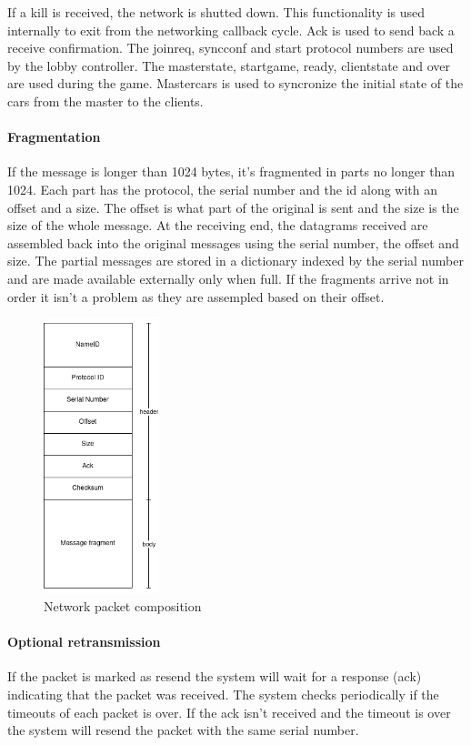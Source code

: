 \documentclass[12pt]{article}
\begin{document}
If a kill is received, the network is shutted down. This functionality is used internally to exit from the networking callback cycle. Ack is used to send back a receive confirmation. The joinreq, syncconf and start protocol numbers are used by the lobby controller. The masterstate, startgame, ready, clientstate and over are used during the game. Mastercars is used to syncronize the initial state of the cars from the master to the clients. \\

\clearpage

\paragraph{Fragmentation}
If the message is longer than 1024 bytes, it's fragmented in parts no longer than 1024. Each part has the protocol, the serial number and the id along with an offset and a size. The offset is what part of the original is sent and the size is the size of the whole message. At the receiving end, the datagrams received are assembled back into the original messages using the serial number, the offset and size. The partial messages are stored in a dictionary indexed by the serial number and are made available externally only when full. If the fragments arrive not in order it isn't a problem as they are assempled based on their offset.

\begin{figure}[H]
\begin{center}
\includegraphics[height=8cm]{packet}
\end{center}
\caption{Network packet composition}
\end{figure}

\paragraph{Optional retransmission}
If the packet is marked as resend the system will wait for a response (ack) indicating that the packet was received. The system checks periodically if the timeouts of each packet is over. If the ack isn't received and the timeout is over the system will resend the packet with the same serial number.
\end{document}
